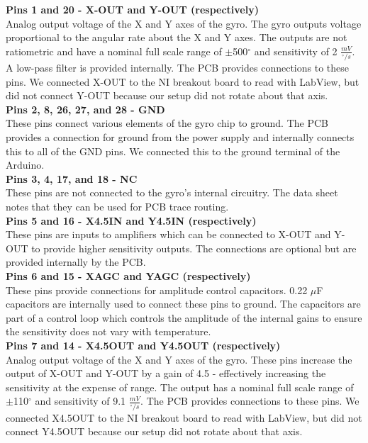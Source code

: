 \documentclass{article}
\theoremstyle{plain}
\theoremstyle{definition}
\theoremstyle{remark}
\begin{document}
\textbf{Pins 1 and 20 - X-OUT and Y-OUT (respectively)}\\
Analog output voltage of the X and Y axes of the gyro. The gyro outputs voltage proportional to the angular rate about the X and Y axes. The outputs are not ratiometric and have a nominal full scale range of $\pm$500$^{\circ}$ and sensitivity of 2 $\frac{mV}{^{\circ}/s}$. A low-pass filter is provided internally. The PCB provides connections to these pins. We connected X-OUT to the NI breakout board to read with LabView, but did not connect Y-OUT because our setup did not rotate about that axis.\\

\textbf{Pins 2, 8, 26, 27, and 28 - GND}\\
These pins connect various elements of the gyro chip to ground. The PCB provides a connection for ground from the power supply and internally connects this to all of the GND pins. We connected this to the ground terminal of the Arduino.\\

\textbf{Pins 3, 4, 17, and 18 - NC}\\
These pins are not connected to the gyro's internal circuitry. The data sheet notes that they can be used for PCB trace routing.\\

\textbf{Pins 5 and 16 - X4.5IN and Y4.5IN (respectively)}\\
These pins are inputs to amplifiers which can be connected to X-OUT and Y-OUT to provide higher sensitivity outputs. The connections are optional but are provided internally by the PCB.\\

\textbf{Pins 6 and 15 - XAGC and YAGC (respectively)}\\
These pins provide connections for amplitude control capacitors. 0.22 $\mu$F capacitors are internally used to connect these pins to ground. The capacitors are part of a control loop which controls the amplitude of the internal gains to ensure the sensitivity does not vary with temperature.\\

\textbf{Pins 7 and 14 - X4.5OUT and Y4.5OUT (respectively)}\\
Analog output voltage of the X and Y axes of the gyro. These pins increase the output of X-OUT and Y-OUT by a gain of 4.5 - effectively increasing the sensitivity at the expense of range. The output has a nominal full scale range of $\pm$110$^{\circ}$ and sensitivity of 9.1 $\frac{mV}{^{\circ}/s}$. The PCB provides connections to these pins. We connected X4.5OUT to the NI breakout board to read with LabView, but did not connect Y4.5OUT because our setup did not rotate about that axis.\\
\end{document}
